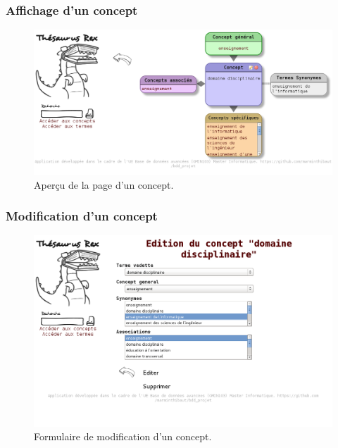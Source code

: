 \subsubsection{Affichage d'un concept}
\begin{figure}[H]
\begin{center}
\includegraphics[width=\textwidth]{files/screen_concept}
\end{center}
\caption{Aperçu de la page d'un concept.}
\end{figure}

\subsubsection{Modification d'un concept}
\begin{figure}[H]
\begin{center}
\includegraphics[width=\textwidth]{files/screen_concept_edit}
\end{center}
\caption{Formulaire de modification d'un concept.}
\end{figure}

